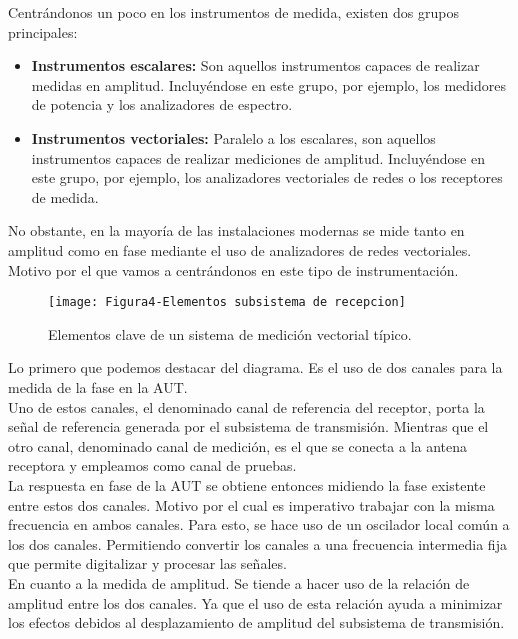 Centrándonos un poco en los instrumentos de medida, existen dos grupos principales: 

\begin{itemize}
    \item \textbf{Instrumentos escalares:} Son aquellos instrumentos capaces de realizar medidas en amplitud. Incluyéndose en este grupo, por ejemplo, los medidores de potencia y los analizadores de espectro. 
    \item \textbf{Instrumentos vectoriales:} Paralelo a los escalares, son aquellos instrumentos capaces de realizar mediciones de amplitud. Incluyéndose en este grupo, por ejemplo, los analizadores vectoriales de redes o los receptores de medida. 
\end{itemize}
No obstante, en la mayoría de las instalaciones modernas se mide tanto en amplitud como en fase mediante el uso de analizadores de redes vectoriales. Motivo por el que vamos a centrándonos en este tipo de instrumentación. 

\newpage

\begin{figure}[h]
    \centering
    \texttt{[image: Figura4-Elementos subsistema de recepcion]}
    \caption{Elementos clave de un sistema de medición vectorial típico.}
    \label{Elementos-subsistema-de-recepcion}
\end{figure} 

Lo primero que podemos destacar del diagrama. Es el uso de dos canales para la medida de la fase en la AUT.\\
Uno de estos canales, el denominado canal de referencia del receptor, porta la señal de referencia generada por el subsistema de transmisión. Mientras que el otro canal, denominado canal de medición, es el que se conecta a la antena receptora y empleamos como canal de pruebas. 
\\

La respuesta en fase de la AUT se obtiene entonces midiendo la fase existente entre estos dos canales. Motivo por el cual es imperativo trabajar con la misma frecuencia en ambos canales. Para esto, se hace uso de un oscilador local común a los dos canales. Permitiendo convertir los canales a una frecuencia intermedia fija que permite digitalizar y procesar las señales. 
\\

En cuanto a la medida de amplitud. Se tiende a hacer uso de la relación de amplitud entre los dos canales. Ya que el uso de esta relación ayuda a minimizar los efectos debidos al desplazamiento de amplitud del subsistema de transmisión. 
\newpage

